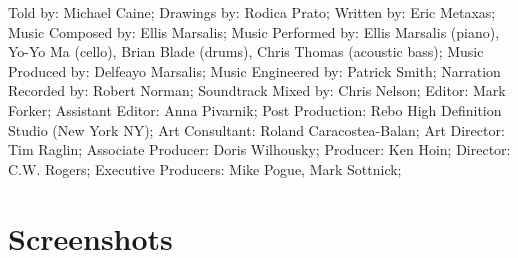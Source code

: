 Told by: Michael Caine;
Drawings by: Rodica Prato;
Written by: Eric Metaxas;
Music Composed by: Ellis Marsalis;
Music Performed by: Ellis Marsalis (piano), Yo-Yo Ma (cello), Brian Blade (drums), Chris Thomas (acoustic bass);
Music Produced by: Delfeayo Marsalis;
Music Engineered by: Patrick Smith;
Narration Recorded by: Robert Norman;
Soundtrack Mixed by: Chris Nelson;
Editor: Mark Forker;
Assistant Editor: Anna Pivarnik;
Post Production: Rebo High Definition Studio (New York NY);
Art Consultant: Roland Caracostea-Balan;
Art Director: Tim Raglin;
Associate Producer: Doris Wilhousky;
Producer: Ken Hoin;
Director: C.W. Rogers;
Executive Producers: Mike Pogue, Mark Sottnick;

\clearpage
\newpage

\section{Screenshots}

